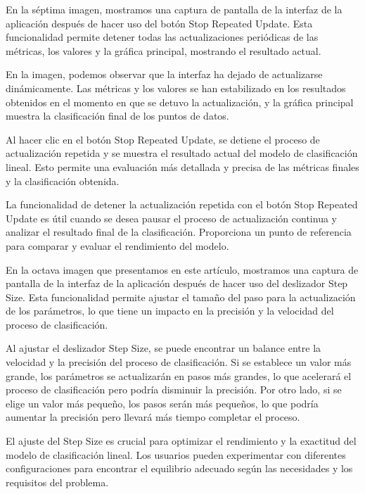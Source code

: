 \documentclass[twoside,10pt]{article}
\numberwithin{equation}{section}
\begin{document}
En la séptima imagen, mostramos una captura de pantalla de la interfaz de la aplicación después de hacer uso del botón Stop Repeated Update. Esta funcionalidad permite detener todas las actualizaciones periódicas de las métricas, los valores y la gráfica principal, mostrando el resultado actual.

En la imagen, podemos observar que la interfaz ha dejado de actualizarse dinámicamente. Las métricas y los valores se han estabilizado en los resultados obtenidos en el momento en que se detuvo la actualización, y la gráfica principal muestra la clasificación final de los puntos de datos.

Al hacer clic en el botón Stop Repeated Update, se detiene el proceso de actualización repetida y se muestra el resultado actual del modelo de clasificación lineal. Esto permite una evaluación más detallada y precisa de las métricas finales y la clasificación obtenida.

La funcionalidad de detener la actualización repetida con el botón Stop Repeated Update es útil cuando se desea pausar el proceso de actualización continua y analizar el resultado final de la clasificación. Proporciona un punto de referencia para comparar y evaluar el rendimiento del modelo.



En la octava imagen que presentamos en este artículo, mostramos una captura de pantalla de la interfaz de la aplicación después de hacer uso del deslizador Step Size. Esta funcionalidad permite ajustar el tamaño del paso para la actualización de los parámetros, lo que tiene un impacto en la precisión y la velocidad del proceso de clasificación.

Al ajustar el deslizador Step Size, se puede encontrar un balance entre la velocidad y la precisión del proceso de clasificación. Si se establece un valor más grande, los parámetros se actualizarán en pasos más grandes, lo que acelerará el proceso de clasificación pero podría disminuir la precisión. Por otro lado, si se elige un valor más pequeño, los pasos serán más pequeños, lo que podría aumentar la precisión pero llevará más tiempo completar el proceso.

El ajuste del Step Size es crucial para optimizar el rendimiento y la exactitud del modelo de clasificación lineal. Los usuarios pueden experimentar con diferentes configuraciones para encontrar el equilibrio adecuado según las necesidades y los requisitos del problema.
\end{document}
